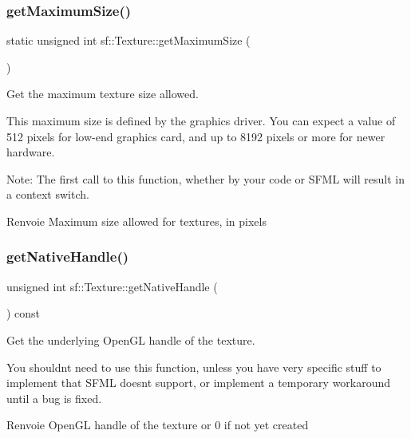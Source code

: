 \subsubsection{\texorpdfstring{get\+Maximum\+Size()}{getMaximumSize()}}
{\footnotesize\ttfamily static unsigned int sf\+::\+Texture\+::get\+Maximum\+Size (\begin{DoxyParamCaption}{ }\end{DoxyParamCaption})\hspace{0.3cm}{\ttfamily [static]}}



Get the maximum texture size allowed. 

This maximum size is defined by the graphics driver. You can expect a value of 512 pixels for low-\/end graphics card, and up to 8192 pixels or more for newer hardware.

Note\+: The first call to this function, whether by your code or S\+F\+ML will result in a context switch.

\begin{DoxyReturn}{Renvoie}
Maximum size allowed for textures, in pixels 
\end{DoxyReturn}
\mbox{\label{classsf_1_1Texture_a674b632608747bfc27b53a4935c835b0}} 
\subsubsection{\texorpdfstring{get\+Native\+Handle()}{getNativeHandle()}}
{\footnotesize\ttfamily unsigned int sf\+::\+Texture\+::get\+Native\+Handle (\begin{DoxyParamCaption}{ }\end{DoxyParamCaption}) const}



Get the underlying Open\+GL handle of the texture. 

You shouldn\textquotesingle{}t need to use this function, unless you have very specific stuff to implement that S\+F\+ML doesn\textquotesingle{}t support, or implement a temporary workaround until a bug is fixed.

\begin{DoxyReturn}{Renvoie}
Open\+GL handle of the texture or 0 if not yet created 
\end{DoxyReturn}
\mbox{\label{classsf_1_1Texture_a9f86b8cc670c6399c539d4ce07ae5c8a}} 
